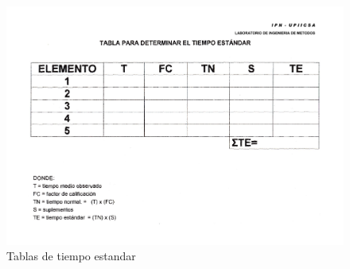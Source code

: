     \begin{figure}[H]
        \centering
        \includegraphics[scale=0.23]{30/img/tablaTiempoEstandar.pdf}
        \caption{Tablas de tiempo estandar}
        \label{fig:tabalatiempoestandar}
    \end{figure}
    
    
    
    
